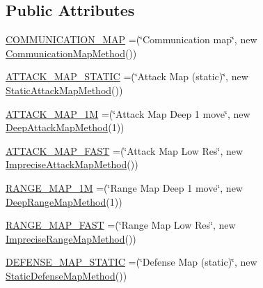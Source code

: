 \subsection*{Public Attributes}
\begin{DoxyCompactItemize}
\item 
\mbox{\hyperlink{enumanalyse_1_1_e_metrics_map_type_a22cc73dd1bde4973231c17e024dbc497}{C\+O\+M\+M\+U\+N\+I\+C\+A\+T\+I\+O\+N\+\_\+\+M\+AP}} =(\char`\"{}Communication map\char`\"{}, new \mbox{\hyperlink{classanalyse_1_1map_methods_1_1_communication_map_method}{Communication\+Map\+Method}}())
\item 
\mbox{\hyperlink{enumanalyse_1_1_e_metrics_map_type_a714cb957ddd05cdc519fc92dafc3e621}{A\+T\+T\+A\+C\+K\+\_\+\+M\+A\+P\+\_\+\+S\+T\+A\+T\+IC}} =(\char`\"{}Attack Map (static)\char`\"{}, new \mbox{\hyperlink{classanalyse_1_1map_methods_1_1_static_attack_map_method}{Static\+Attack\+Map\+Method}}())
\item 
\mbox{\hyperlink{enumanalyse_1_1_e_metrics_map_type_a9e5b24b0dc6af16ca2b3622c793d6735}{A\+T\+T\+A\+C\+K\+\_\+\+M\+A\+P\+\_\+1M}} =(\char`\"{}Attack Map Deep 1 move\char`\"{}, new \mbox{\hyperlink{classanalyse_1_1map_methods_1_1_deep_attack_map_method}{Deep\+Attack\+Map\+Method}}(1))
\item 
\mbox{\hyperlink{enumanalyse_1_1_e_metrics_map_type_a105e8dec2222591651c0e853cc977655}{A\+T\+T\+A\+C\+K\+\_\+\+M\+A\+P\+\_\+\+F\+A\+ST}} =(\char`\"{}Attack Map Low Res\char`\"{}, new \mbox{\hyperlink{classanalyse_1_1map_methods_1_1_imprecise_attack_map_method}{Imprecise\+Attack\+Map\+Method}}())
\item 
\mbox{\hyperlink{enumanalyse_1_1_e_metrics_map_type_aa15e2ab19360a301d13b633003553c90}{R\+A\+N\+G\+E\+\_\+\+M\+A\+P\+\_\+1M}} =(\char`\"{}Range Map Deep 1 move\char`\"{}, new \mbox{\hyperlink{classanalyse_1_1map_methods_1_1_deep_range_map_method}{Deep\+Range\+Map\+Method}}(1))
\item 
\mbox{\hyperlink{enumanalyse_1_1_e_metrics_map_type_af3d5a25a4a59a36b66a8f4dd637451ae}{R\+A\+N\+G\+E\+\_\+\+M\+A\+P\+\_\+\+F\+A\+ST}} =(\char`\"{}Range Map Low Res\char`\"{}, new \mbox{\hyperlink{classanalyse_1_1map_methods_1_1_imprecise_range_map_method}{Imprecise\+Range\+Map\+Method}}())
\item 
\mbox{\hyperlink{enumanalyse_1_1_e_metrics_map_type_a97f5c4d38d738d2587793ee43c37a30e}{D\+E\+F\+E\+N\+S\+E\+\_\+\+M\+A\+P\+\_\+\+S\+T\+A\+T\+IC}} =(\char`\"{}Defense Map (static)\char`\"{}, new \mbox{\hyperlink{classanalyse_1_1map_methods_1_1_static_defense_map_method}{Static\+Defense\+Map\+Method}}())

\end{DoxyCompactItemize}
